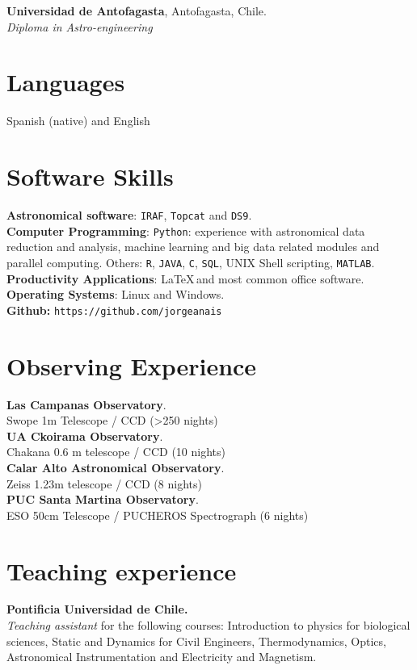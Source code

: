 \documentclass[11pt, a4paper]{article}
\newcommand{\years}[1]{\marginnote{ #1}}
\begin{document}
\years{2016} \textbf{Universidad de Antofagasta}, Antofagasta, Chile.\\
\textit{Diploma in Astro-engineering}


\section*{Languages}

Spanish (native) and English 

\section*{Software Skills}
\textbf{Astronomical software}: \texttt{IRAF}, \texttt{Topcat} and \texttt{DS9}.\\
\textbf{Computer Programming}: \texttt{Python}: experience with astronomical data reduction and analysis, machine learning and big data related modules and parallel computing. Others: \texttt{R}, \texttt{JAVA}, \texttt{C}, \texttt{SQL}, UNIX Shell scripting, \texttt{MATLAB}.\\
\textbf{Productivity Applications}: \LaTeX \,and most common office software.\\
\textbf{Operating Systems}: Linux and Windows.\\
\textbf{Github:} \texttt{https://github.com/jorgeanais}



\section*{Observing Experience}

\textbf{Las Campanas Observatory}.\\ Swope 1m Telescope / CCD (>250 nights)\\[0.1cm]
\textbf{UA Ckoirama Observatory}.\\ Chakana 0.6 m telescope / CCD (10 nights)\\[0.1cm]
\textbf{Calar Alto Astronomical Observatory}.\\ Zeiss 1.23m telescope / CCD (8 nights)\\[0.1cm]
\textbf{PUC Santa Martina Observatory}.\\ ESO 50cm Telescope / PUCHEROS Spectrograph (6 nights)



\section*{Teaching experience}
\years{2010-2014} \textbf{Pontificia Universidad de Chile.}\\
\textit{Teaching assistant} for the following courses: Introduction to physics for biological\\
 sciences, Static and Dynamics for Civil Engineers, Thermodynamics, Optics,\\
 Astronomical Instrumentation and Electricity and Magnetism.
\end{document}
